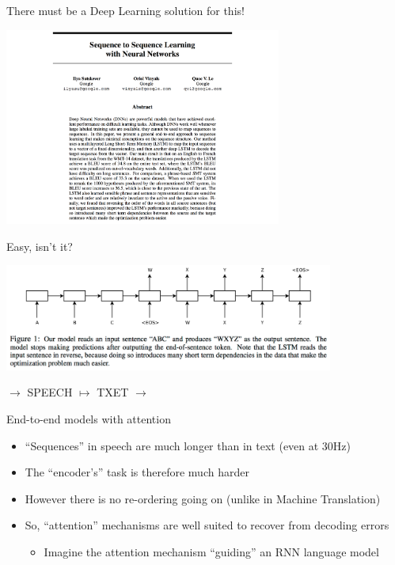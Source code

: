\begin{frame}{There must be a Deep Learning solution for this!}
  \begin{center}
    \includegraphics[height=65mm]{figures/s2s}
  \end{center}
\end{frame}

\begin{frame}{Easy, isn't it?}
  \begin{center}
    \includegraphics[height=35mm]{figures/s2s-fig}
  \end{center}
\hspace{1.7cm} $\rightarrow$ SPEECH $\mapsto$ TXET $\rightarrow$
\end{frame}

\begin{frame}{End-to-end models with attention}
  \begin{itemize}
  \item ``Sequences'' in speech are much longer than in text (even at 30Hz)
  \item The ``encoder's'' task is therefore much harder
  \item However there is no re-ordering going on (unlike in Machine Translation)
  \item So, ``attention'' mechanisms are well suited to recover from decoding errors
    \begin{itemize}
    \item Imagine the attention mechanism ``guiding'' an RNN language model
    \end{itemize}
  \end{itemize}
\end{frame}

